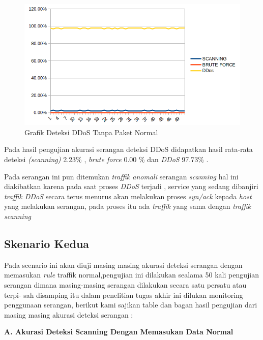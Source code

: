 	\begin{figure}[H]
		\centering
		\includegraphics[scale=0.9]{gambar/DDOS}
		\caption{Grafik Deteksi DDoS Tanpa Paket Normal}
		\label{Grafik Deteksi DDoS Tanpa Paket Normal}
	\end{figure}
	
	
	Pada hasil pengujian akurasi serangan deteksi DDoS didapatkan hasil rata-rata deteksi \emph{(scanning)} 2.23\% , \emph{brute force} 0.00 \% dan \emph{DDoS} 97.73\% . 
	
	Pada serangan ini pun ditemukan \emph{traffik anomali} serangan \emph{scanning} hal ini diakibatkan karena pada saat proses  \emph{DDoS} terjadi , service yang sedang dibanjiri \emph{traffik DDoS} secara terus menurus akan melakukan proses \emph{syn/ack} kepada \emph{host} yang melakukan serangan, pada proses itu ada \emph{traffik} yang sama dengan \emph{traffik scanning} 
		
		
		\newpage
		
		\subsection{Skenario Kedua}
				
		Pada scenario ini  akan diuji masing masing akurasi deteksi serangan dengan memasukan \emph{rule} traffik normal,pengujian ini dilakukan sealama 50 kali pengujian
		serangan dimana masing-masing serangan dilakukan secara satu persatu atau terpi-
		sah disamping itu dalam penelitian tugas akhir ini dilukan monitoring penggunaan
		serangan, berikut kami sajikan table dan bagan hasil pengujian dari masing masing akurasi deteksi serangan :
		\newline
		
		
				

		\noindent
		\textbf{A. Akurasi Deteksi Scanning Dengan Memasukan Data Normal}
		
